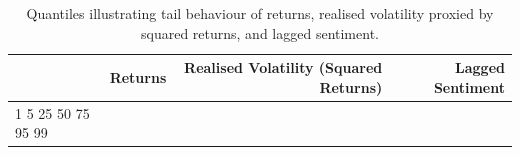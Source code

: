 \begin{table}
\caption{Quantiles illustrating tail behaviour of returns, realised volatility proxied by squared returns, and lagged sentiment.}
\label{tab:quantiles_tail_behaviour}
\begin{tabular}{lrrr}
\toprule
 & Returns & Realised Volatility (Squared Returns) & Lagged Sentiment \\
\midrule
1%
5%
25%
50%
75%
95%
99%
\bottomrule
\end{tabular}
\end{table}
